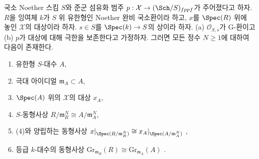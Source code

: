 \begin{lemma}
\label{lemma-approximate}
국소 Noether 스킴 $S$와 준군 섬유화 범주
$p : \mathcal{X} \to (\Sch/S)_{fppf}$가 주어졌다고 하자.
$R$을 잉여체 $k$가 $S$ 위 유한형인 Noether 완비 국소환이라 하고,
$x$를 $\Spec(R)$ 위에 놓인 $\mathcal{X}$의 대상이라 하자.
$s \in S$를 $\Spec(k) \to S$의 상이라 하자. (a) $\mathcal{O}_{S, s}$가
G-환이고 (b) $p$가 대상에 대해 극한을 보존한다고 가정하자. 그러면
모든 정수 $N \geq 1$에 대하여 다음이 존재한다.
\begin{enumerate}
\item 유한형 $S$-대수 $A$,
\item 극대 아이디얼 $\mathfrak m_A \subset A$,
\item $\Spec(A)$ 위의 $\mathcal{X}$의 대상 $x_A$,
\item $S$-동형사상 $R/\mathfrak m_R^N \cong A/\mathfrak m_A^N$,
\item (4)와 양립하는 동형사상
$x|_{\Spec(R/\mathfrak m_R^N)} \cong x_A|_{\Spec(A/\mathfrak m_A^N)}$
,
\item 등급 $k$-대수의 동형사상
$\text{Gr}_{\mathfrak m_R}(R) \cong \text{Gr}_{\mathfrak m_A}(A)$
.
\end{enumerate}
\end{lemma}

